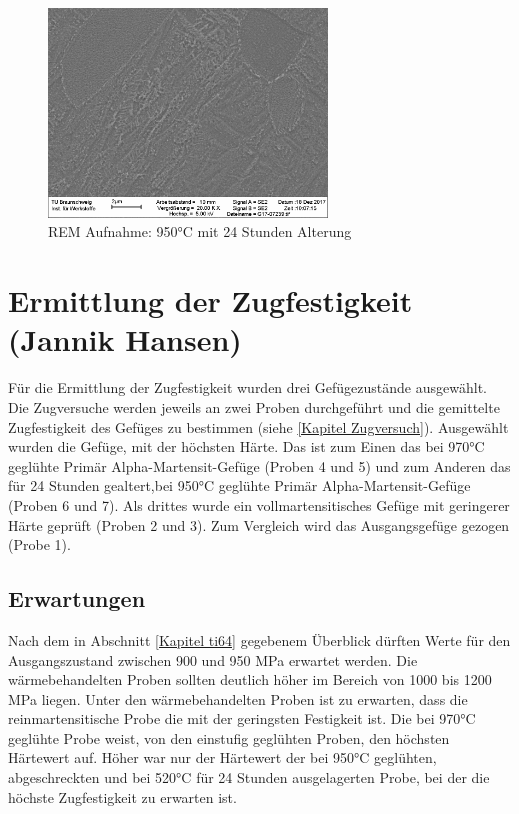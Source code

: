 \documentclass[a4paper, 11pt]{tubsreprt}
\begin{document}
\begin{figure}
\centering
\includegraphics[width=0.66\textwidth]{Bilder/REM950C1hWQ520C24hAC.png}
\caption{REM Aufnahme: 950°C mit 24 Stunden Alterung}
\label{REM 950C 24h}
\end{figure}

\section{Ermittlung der Zugfestigkeit (Jannik Hansen)}

Für die Ermittlung der Zugfestigkeit wurden drei Gefügezustände ausgewählt. Die Zugversuche werden jeweils an zwei Proben durchgeführt und die gemittelte Zugfestigkeit des Gefüges zu bestimmen (siehe  \ref{Kapitel Zugversuch}). Ausgewählt wurden die Gefüge, mit der höchsten Härte. Das ist zum Einen das bei 970°C geglühte Primär Alpha-Martensit-Gefüge (Proben 4 und 5) und zum Anderen das für 24 Stunden gealtert,bei 950°C geglühte Primär Alpha-Martensit-Gefüge (Proben 6 und 7). Als drittes wurde ein vollmartensitisches Gefüge mit geringerer Härte geprüft (Proben 2 und 3). Zum Vergleich wird das Ausgangsgefüge gezogen (Probe 1).
\subsection*{Erwartungen}
Nach dem in Abschnitt \ref{Kapitel ti64} gegebenem Überblick dürften Werte für den Ausgangszustand zwischen 900 und 950 MPa erwartet werden. Die wärmebehandelten Proben sollten deutlich höher im Bereich von 1000 bis 1200 MPa liegen. Unter den wärmebehandelten Proben ist zu erwarten, dass die reinmartensitische Probe die mit der geringsten Festigkeit ist. Die bei 970°C geglühte Probe weist, von den einstufig geglühten Proben, den höchsten Härtewert auf. Höher war nur der Härtewert der bei 950°C geglühten, abgeschreckten und bei 520°C für 24 Stunden ausgelagerten Probe, bei der die höchste Zugfestigkeit zu erwarten ist.
\end{document}
